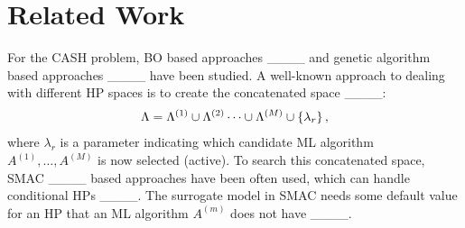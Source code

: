 \section{Related Work}
\label{sec:related_works}


For the CASH problem, BO based approaches ____ and genetic algorithm based approaches ____ have been studied.
%
A well-known approach to dealing with different HP spaces is to create the concatenated space 
____: 
\begin{align*}
 \*{\Lambda} = \*{\Lambda}^{(1)} \cup \*{\Lambda}^{(2)} \cdots \cup \*{\Lambda}^{(M)} \cup \left\{\lambda_r\right\}, 
\end{align*}
where 
$\lambda_r$
is a parameter indicating which candidate ML algorithm $A^{(1)}, \ldots, A^{(M)}$ is now selected (active).
%
To search this concatenated space, SMAC ____ based approaches have been often used, which can handle conditional HPs ____.
%
The surrogate model in SMAC needs some default value for an HP that an ML algorithm $A^{(m)}$ does not have ____.
%
